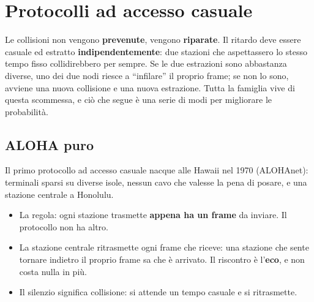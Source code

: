 \section{Protocolli ad accesso casuale}


Le collisioni non vengono \textbf{prevenute}, vengono \textbf{riparate}. Il ritardo deve essere casuale ed estratto
\textbf{indipendentemente}: due stazioni che aspettassero lo stesso tempo fisso collidirebbero per sempre. Se le due estrazioni sono
abbastanza diverse, uno dei due nodi riesce a ``infilare'' il proprio frame; se non lo sono, avviene una nuova collisione e una nuova
estrazione. Tutta la famiglia vive di questa scommessa, e ciò che segue è una serie di modi per migliorare le probabilità.

\subsection{ALOHA puro}

Il primo protocollo ad accesso casuale nacque alle Hawaii nel 1970 (ALOHAnet): terminali sparsi su diverse isole, nessun cavo che
valesse la pena di posare, e una stazione centrale a Honolulu.

\begin{itemize}
    \item La regola: ogni stazione trasmette \textbf{appena ha un frame} da inviare. Il protocollo non ha altro.
    \item La stazione centrale ritrasmette ogni frame che riceve: una stazione che sente tornare indietro il proprio frame sa che è
          arrivato. Il riscontro è l'\textbf{eco}, e non costa nulla in più.
    \item Il silenzio significa collisione: si attende un tempo casuale e si ritrasmette.
\end{itemize}

